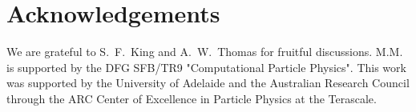 \documentclass[12pt,a4paper]{article}
\begin{document}
\vspace{-5mm}
\section*{Acknowledgements}
\vspace{-3mm}
We are grateful to S.~F.~King and A.~W.~Thomas for  fruitful discussions.
M.M. is supported by the DFG SFB/TR9 "Computational Particle Physics".
This work was supported by the University of Adelaide and the Australian Research Council through the ARC
Center of Excellence in Particle Physics at the Terascale. 











\newpage
\end{document}
